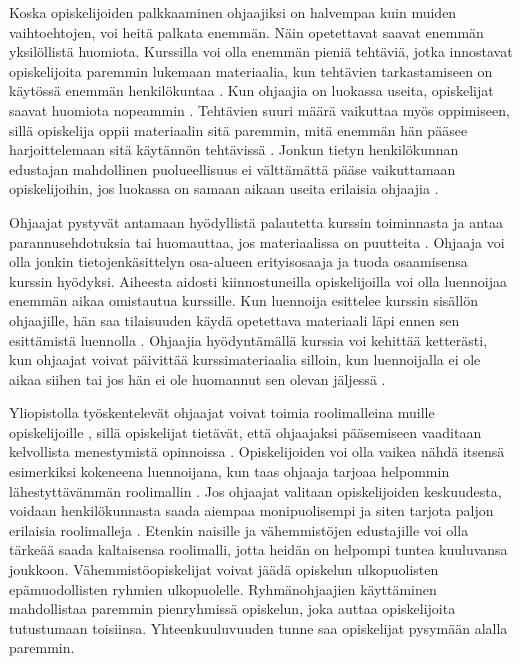 \documentclass[finnish]{tktltiki2}
\theoremstyle{definition}
\theoremstyle{remark}
\begin{document}
Koska opiskelijoiden palkkaaminen ohjaajiksi on halvempaa kuin muiden vaihtoehtojen, voi heitä palkata enemmän. Näin opetettavat saavat enemmän yksilöllistä huomiota. Kurssilla voi olla enemmän pieniä tehtäviä, jotka innostavat opiskelijoita paremmin lukemaan materiaalia, kun tehtävien tarkastamiseen on käytössä enemmän henkilökuntaa \cite{Dickson11}. Kun ohjaajia on luokassa useita, opiskelijat saavat huomiota nopeammin \cite{Ferstl10}. Tehtävien suuri määrä vaikuttaa myös oppimiseen, sillä opiskelija oppii materiaalin sitä paremmin, mitä enemmän hän pääsee harjoittelemaan sitä käytännön tehtävissä \cite{Vikberg}. Jonkun tietyn henkilökunnan edustajan mahdollinen puolueellisuus ei välttämättä pääse vaikuttamaan opiskelijoihin, jos luokassa on samaan aikaan useita erilaisia ohjaajia \cite{Morgan02}.  \par

Ohjaajat pystyvät antamaan hyödyllistä palautetta kurssin toiminnasta ja antaa parannusehdotuksia \cite{Decker06} tai huomauttaa, jos materiaalissa on puutteita \cite{Dickson11}. Ohjaaja voi olla jonkin tietojenkäsittelyn osa-alueen erityisosaaja ja tuoda osaamisensa kurssin hyödyksi. Aiheesta aidosti kiinnostuneilla opiskelijoilla voi olla luennoijaa enemmän aikaa omistautua kurssille. Kun luennoija esittelee kurssin sisällön ohjaajille, hän saa tilaisuuden käydä opetettava materiaali läpi ennen sen esittämistä luennolla \cite{Kopp00}. Ohjaajia hyödyntämällä kurssia voi kehittää ketterästi, kun ohjaajat voivat päivittää kurssimateriaalia silloin, kun luennoijalla ei ole aikaa siihen tai jos hän ei ole huomannut sen olevan jäljessä \cite{Dickson11}. \par

Yliopistolla työskentelevät ohjaajat voivat toimia roolimalleina muille opiskelijoille \cite{Roberts95, Tashakkori05}, sillä opiskelijat tietävät, että ohjaajaksi pääsemiseen vaaditaan kelvollista menestymistä opinnoissa \cite{Bernstein}. Opiskelijoiden voi olla vaikea nähdä itsensä esimerkiksi kokeneena luennoijana, kun taas ohjaaja tarjoaa helpommin lähestyttävämmän roolimallin \cite{Roberts02}. Jos ohjaajat valitaan opiskelijoiden keskuudesta, voidaan henkilökunnasta saada aiempaa monipuolisempi ja siten tarjota paljon erilaisia roolimalleja \cite{Morgan02}. Etenkin naisille ja vähemmistöjen edustajille voi olla tärkeää saada kaltaisensa roolimalli, jotta heidän on helpompi tuntea kuuluvansa joukkoon. Vähemmistöopiskelijat voivat jäädä opiskelun ulkopuolisten epämuodollisten ryhmien ulkopuolelle. Ryhmänohjaajien käyttäminen mahdollistaa paremmin pienryhmissä opiskelun, joka auttaa opiskelijoita tutustumaan toisiinsa. Yhteenkuuluvuuden tunne saa opiskelijat pysymään alalla paremmin. \par
\end{document}
